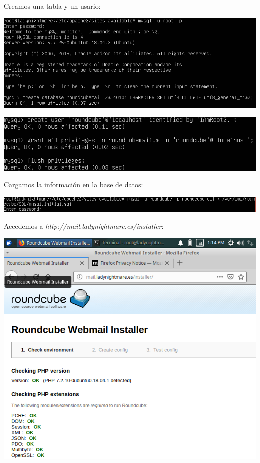 \documentclass{article}
\begin{document}
Creamos una tabla y un usario:

\begin{center}
\includegraphics[scale=0.6]{images/query.png}
\end{center}

\begin{center}
\includegraphics[scale=0.6]{images/priv.png}
\end{center}

Cargamos la información en la base de datos:

\begin{center}
\includegraphics[scale=0.4]{images/info.png}
\end{center}

Accedemos a \textit{http://mail.ladynightmare.es/installer}:

\begin{center}
\includegraphics[scale=0.6]{images/webmail.png}
\end{center}
\end{document}
